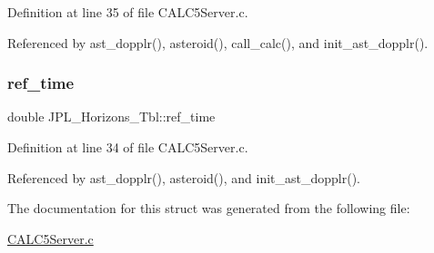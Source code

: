 Definition at line 35 of file C\+A\+L\+C5\+Server.\+c.



Referenced by ast\+\_\+dopplr(), asteroid(), call\+\_\+calc(), and init\+\_\+ast\+\_\+dopplr().

\mbox{\label{struct_j_p_l___horizons___tbl_abd8ee518e5a45192fea57fbcd16708b1}} 
\subsubsection{\texorpdfstring{ref\+\_\+time}{ref\_time}}
{\footnotesize\ttfamily double J\+P\+L\+\_\+\+Horizons\+\_\+\+Tbl\+::ref\+\_\+time}



Definition at line 34 of file C\+A\+L\+C5\+Server.\+c.



Referenced by ast\+\_\+dopplr(), asteroid(), and init\+\_\+ast\+\_\+dopplr().



The documentation for this struct was generated from the following file\+:\begin{DoxyCompactItemize}
\item 
\hyperlink{_c_a_l_c5_server_8c}{C\+A\+L\+C5\+Server.\+c}\end{DoxyCompactItemize}
